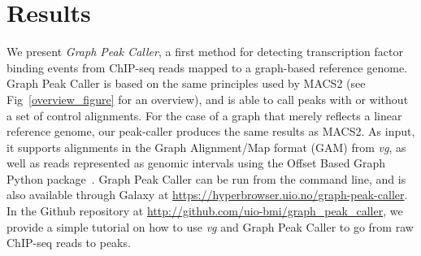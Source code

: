 \documentclass[10pt,letterpaper]{article}
\begin{document}
\section*{Results}
We present \emph{Graph Peak Caller}, a first method for detecting transcription factor binding events from ChIP-seq reads mapped to a graph-based reference genome. Graph Peak Caller is based on the same principles used by MACS2 (see Fig~\ref{overview_figure} for an overview), and  is able to call peaks with or without a set of control alignments. For the case of a graph that merely reflects a linear reference genome, our peak-caller produces the same results as MACS2. As input, it supports alignments in the Graph Alignment/Map format (GAM) from \emph{vg}, as well as reads represented as genomic intervals using the Offset Based Graph Python package~\cite{rand}. Graph Peak Caller can be run from the command line, and is also available through Galaxy at \url{https://hyperbrowser.uio.no/graph-peak-caller}.
In the Github repository at \url{http://github.com/uio-bmi/graph_peak_caller}, we provide a simple tutorial on how to use \emph{vg} and Graph Peak Caller to go from raw ChIP-seq reads to peaks. 
\end{document}
